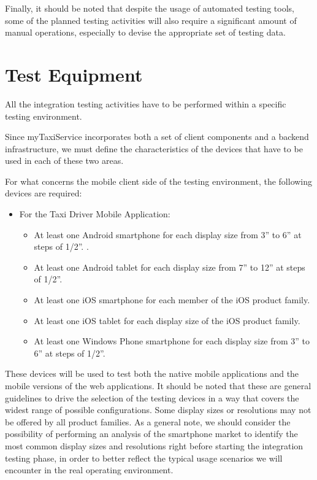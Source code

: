 Finally, it should be noted that despite the usage of automated testing tools, some of the planned testing activities will also require a significant amount of manual operations, especially to devise the appropriate set of testing data.

\section{Test Equipment}
All the integration testing activities have to be performed within a specific testing environment. 

Since myTaxiService incorporates both a set of client components and a backend infrastructure, we must define the characteristics of the devices that have to be used in each of these two areas.

For what concerns the mobile client side of the testing environment, the following devices are required:
\begin{itemize}
	\item For the Taxi Driver Mobile Application:
		\begin{itemize}
		\item At least one Android smartphone for each display size from 3” to 6” at steps of 1/2”. .
		\item At least one Android tablet for each display size from 7” to 12” at steps of 1/2”. 
		\item At least one iOS smartphone for each member of the iOS product family.
		\item At least one iOS tablet for each display size of the iOS product family.
		\item At least one Windows Phone smartphone for each display size from 3” to 6” at steps of 1/2”. 
		\end{itemize}
\end{itemize}
These devices will be used to test both the native mobile applications and the mobile versions of the web applications.
It should be noted that these are general guidelines to drive the selection of the testing devices in a way that covers the widest range of possible configurations. Some display sizes or resolutions may not be offered by all product families. 
As a general note, we should consider the possibility of performing an analysis of the smartphone market to identify the most common display sizes and resolutions right before starting the integration testing phase, in order to better reflect the typical usage scenarios we will encounter in the real operating environment. 

